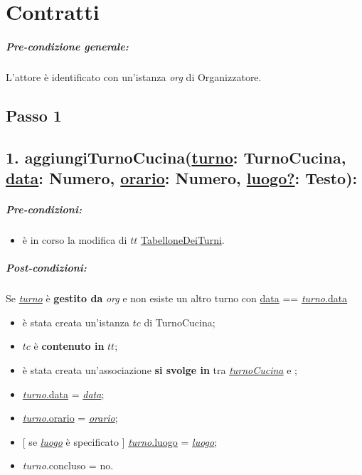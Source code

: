 \chapter{Contratti}
\paragraph{Pre-condizione generale:} L'attore è identificato con un'istanza \textit{org} di Organizzatore.

\section{Passo 1}
\section*{1. aggiungiTurnoCucina(\underline{turno}: TurnoCucina, \underline{data}: Numero, \underline{orario}: Numero, \underline{luogo?}: Testo):}

\paragraph{Pre-condizioni:} 
\begin{itemize}
    \item è in corso la modifica di $tt$ \underline{TabelloneDeiTurni}.
\end{itemize}

\paragraph{Post-condizioni:} Se \underline{\textit{turno}} è \textbf{gestito da} {\textit{org}} e non esiste un altro turno con \underline{data} == \underline{\textit{turno}.data} 

\begin{itemize}
    \item è stata creata un'istanza $tc$ di TurnoCucina;
    \item $tc$ è \textbf{contenuto in} $tt$;
    \item è stata creata un'associazione \textbf{si svolge in} tra \underline{\textit{turnoCucina}} e ;
    \item \underline{\textit{turno}.data} = \underline{\textit{data}};
    \item \underline{\textit{turno}.orario} = \underline{\textit{orario}};
    \item $[$ se \underline{\textit{luogo}} è specificato $]$ \underline{\textit{turno}.luogo} = \underline{\textit{luogo}};
    \item \textit{turno}.concluso  = no.
\end{itemize}

